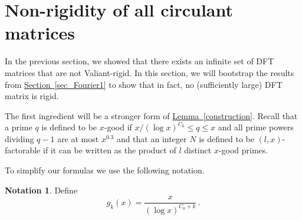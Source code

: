 \documentclass[11pt]{article}
\numberwithin{equation}{section}
\theoremstyle{definition}
\theoremstyle{plain}
\newcommand{\expref}[2]{\hyperref[#2]{#1~\ref{#2}}}
\theoremstyle{definition}
\newtheorem{notation}[theorem]{Notation}
\begin{document}
\section{Non-rigidity of all circulant matrices}\label{sec_Fourier2}
In the previous section, we showed that there exists an infinite set of %
DFT %
 matrices that are not Valiant-rigid.  In this section, we will bootstrap the results from \expref{Section}{sec_Fourier1} to show that in fact, %
no (sufficiently large) DFT matrix is rigid.

The first ingredient will be a stronger form of \expref{Lemma}{construction}.  Recall that a prime $q$ is defined to be $x$-good if $x/(\log x)^{C_0} \leq q \leq x$ and all prime powers dividing $q-1$ are at most $x^{0.3}$ and that an integer $N$ is defined to be $(l,x)$-factorable if it can be written as the product of $l$ distinct $x$-good primes.

%
%
To simplify our formulas we use the following notation.   %
\begin{notation}    \label{not:bypolylog}
Define 
\[
g_k(x) = \frac{x}{(\log x)^{C_0 + k}} \,.
\]
\end{notation}
%
\end{document}
